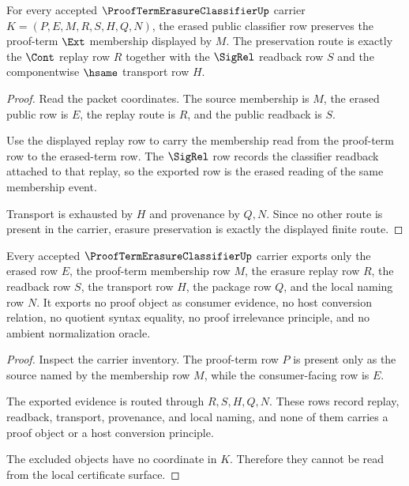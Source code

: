 \begin{theorem}
\label{thm:proof-term-erasure-classifier-erasure-preservation}
For every accepted $\ProofTermErasureClassifierUp$ carrier $K=(P,E,M,R,S,H,Q,N)$, the erased public classifier row preserves the proof-term $\Ext$ membership displayed by $M$. The preservation route is exactly the $\Cont$ replay row $R$ together with the $\SigRel$ readback row $S$ and the componentwise $\hsame$ transport row $H$.
\end{theorem}
\begin{proof}
Read the packet coordinates. The source membership is $M$, the erased public row is $E$, the replay route is $R$, and the public readback is $S$.

Use the displayed replay row to carry the membership read from the proof-term row to the erased-term row. The $\SigRel$ row records the classifier readback attached to that replay, so the exported row is the erased reading of the same membership event.

Transport is exhausted by $H$ and provenance by $Q,N$. Since no other route is present in the carrier, erasure preservation is exactly the displayed finite route.
\end{proof}

\begin{theorem}
\label{thm:proof-term-erasure-classifier-ledger-nonescape}
Every accepted $\ProofTermErasureClassifierUp$ carrier exports only the erased row $E$, the proof-term membership row $M$, the erasure replay row $R$, the readback row $S$, the transport row $H$, the package row $Q$, and the local naming row $N$. It exports no proof object as consumer evidence, no host conversion relation, no quotient syntax equality, no proof irrelevance principle, and no ambient normalization oracle.
\end{theorem}
\begin{proof}
Inspect the carrier inventory. The proof-term row $P$ is present only as the source named by the membership row $M$, while the consumer-facing row is $E$.

The exported evidence is routed through $R,S,H,Q,N$. These rows record replay, readback, transport, provenance, and local naming, and none of them carries a proof object or a host conversion principle.

The excluded objects have no coordinate in $K$. Therefore they cannot be read from the local certificate surface.
\end{proof}

